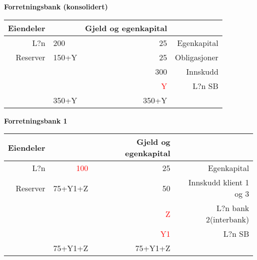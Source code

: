 \documentclass[a4paper,notitlepage]{article}
\begin{document}
\textbf{Forretningsbank (konsolidert)}
\begin{center}\begin{tabular}{rlrr}
    \textbf{Eiendeler} & \textbf{} & \textbf{Gjeld og egenkapital} & \textbf{} \\
\hline    L?n   & {200}    & 25    & Egenkapital \\
    Reserver  &  150+Y   & 25    & Obligasjoner \\
          &       & {300}    & Innskudd \\
          &       & \textcolor{red}{Y}    & L?n SB \\
\hline          & 350+Y   & 350+Y   &  \\
\end{tabular}%
\end{center}
\noindent \textbf{Forretningsbank 1}
\begin{center}
\begin{tabular}{rrrr}
    \textbf{Eiendeler} & \textbf{} & \textbf{Gjeld og egenkapital} & \textbf{} \\
\hline    L?n   & \textcolor{red}{100}    & 25    & Egenkapital \\
    Reserver & 75+Y1+Z    & 50    & Innskudd klient 1 og 3 \\
  &     & \textcolor{red}{Z}    & L?n bank 2(interbank) \\
  &     & \textcolor{red}{Y1}    & L?n SB \\

\hline          & 75+Y1+Z    & 75+Y1+Z    &  \\
\end{tabular}%
\end{center}
\end{document}
